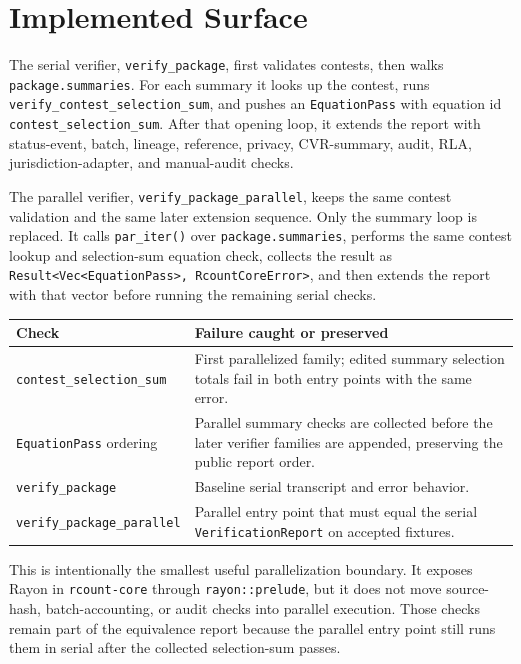 \section{Implemented Surface}

The serial verifier, \texttt{verify\_package}, first validates contests, then
walks \texttt{package.summaries}. For each summary it looks up the contest,
runs \texttt{verify\_contest\_selection\_sum}, and pushes an
\texttt{EquationPass} with equation id \texttt{contest\_selection\_sum}.
After that opening loop, it extends the report with status-event, batch,
lineage, reference, privacy, CVR-summary, audit, RLA, jurisdiction-adapter, and
manual-audit checks.

The parallel verifier, \texttt{verify\_package\_parallel}, keeps the same
contest validation and the same later extension sequence. Only the summary loop
is replaced. It calls \texttt{par\_iter()} over \texttt{package.summaries},
performs the same contest lookup and selection-sum equation check, collects the
result as \texttt{Result<Vec<EquationPass>, RcountCoreError>}, and then extends
the report with that vector before running the remaining serial checks.

\begin{center}
\small
\begin{tabularx}{\textwidth}{lX}
\toprule
Check & Failure caught or preserved \\
\midrule
\texttt{contest\_selection\_sum} & First parallelized family; edited summary
selection totals fail in both entry points with the same error. \\
\texttt{EquationPass} ordering & Parallel summary checks are collected before
the later verifier families are appended, preserving the public report order. \\
\texttt{verify\_package} & Baseline serial transcript and error behavior. \\
\texttt{verify\_package\_parallel} & Parallel entry point that must equal the
serial \texttt{VerificationReport} on accepted fixtures. \\
\bottomrule
\end{tabularx}
\end{center}

This is intentionally the smallest useful parallelization boundary. It exposes
Rayon in \texttt{rcount-core} through \texttt{rayon::prelude}, but it does not
move source-hash, batch-accounting, or audit checks into parallel execution.
Those checks remain part of the equivalence report because the parallel entry
point still runs them in serial after the collected selection-sum passes.
